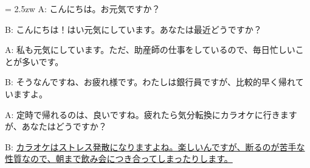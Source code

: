 \documentclass[11pt]{amsart}
\title{}
\author{}
\newenvironment{hangall}[1]{\hangindent = 2.5zw\everypar{\hangindent = 2.5zw}}{}
\begin{document}
\maketitle
\begin{hangall}{}%
A: こんにちは。お元気ですか？

B: こんにちは！はい元気にしています。あなたは最近どうですか？

A: 私も元気にしています。ただ、助産師の仕事をしているので、毎日忙しいことが多いです。

B: そうなんですね、お疲れ様です。わたしは銀行員ですが、比較的早く帰れていますよ。

A: 定時で帰れるのは、良いですね。疲れたら気分転換にカラオケに行きますが、あなたはどうですか？

B: \ul{カラオケはストレス発散になりますよね。楽しいんですが、断るのが苦手な性質なので、朝まで飲み会につき合ってしまったりします。}\end{hangall}
\end{document}
